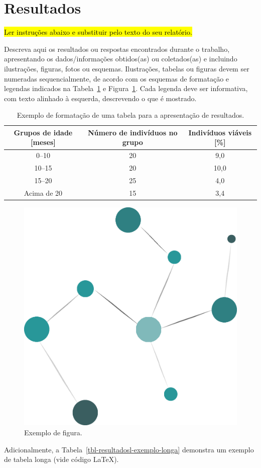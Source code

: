 \documentclass[10pt, a4paper]{article}
\begin{document}
\section{Resultados}
\label{sec-resultados}

\hl{Ler instruções abaixo e substituir pelo texto do seu relatório.}

Descreva aqui os resultados ou respostas encontrados durante o trabalho, apresentando os dados/informações obtidos(as) ou coletados(as) e incluindo ilustrações, figuras, fotos ou esquemas. Ilustrações, tabelas ou figuras devem ser numeradas sequencialmente, de acordo com os esquemas de formatação e legendas indicados na Tabela~\ref{tbl-resultadosl-exemplo} e Figura~\ref{fig-resultados-exemplo}. Cada legenda deve ser informativa, com texto alinhado à esquerda, descrevendo o que é mostrado.

\begin{table}
	\caption{Exemplo de formatação de uma tabela para a apresentação de resultados.}
	\label{tbl-resultadosl-exemplo}
	\centering
	\begin{tabular}{ccc}
		\hline
		Grupos de idade [meses] & Número de indivíduos no grupo & Indivíduos viáveis [\%] \\
		\hline
		0--10 & 20 & 9,0 \\
		10--15 & 20 & 10,0 \\
		15--20 & 25 & 4,0 \\
		Acima de 20 & 15 & 3,4  \\
		\hline
	\end{tabular}
\end{table}

\begin{figure}[H]
	\centering
	\includegraphics[width=.25\textwidth]{figuras/fig-resultados-exemplo.png} 
	\caption{Exemplo de figura.}
	\label{fig-resultados-exemplo}
\end{figure}

Adicionalmente, a Tabela~\ref{tbl-resultadosl-exemplo-longa} demonstra um exemplo de tabela longa (vide código \LaTeX).
\end{document}
